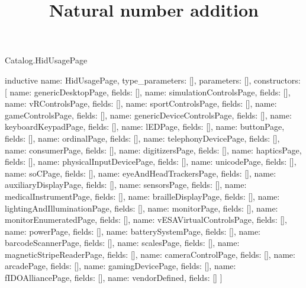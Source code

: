 \begin{lexlean}{Catalog.HidUsagePage}
\title{Natural number addition}
\begin{semanticmodule}
inductive{
  name: HidUsagePage,
  type_parameters: [],
  parameters: [],
  constructors: [
    {name: genericDesktopPage, fields: []},
    {name: simulationControlsPage, fields: []},
    {name: vRControlsPage, fields: []},
    {name: sportControlsPage, fields: []},
    {name: gameControlsPage, fields: []},
    {name: genericDeviceControlsPage, fields: []},
    {name: keyboardKeypadPage, fields: []},
    {name: lEDPage, fields: []},
    {name: buttonPage, fields: []},
    {name: ordinalPage, fields: []},
    {name: telephonyDevicePage, fields: []},
    {name: consumerPage, fields: []},
    {name: digitizersPage, fields: []},
    {name: hapticsPage, fields: []},
    {name: physicalInputDevicePage, fields: []},
    {name: unicodePage, fields: []},
    {name: soCPage, fields: []},
    {name: eyeAndHeadTrackersPage, fields: []},
    {name: auxiliaryDisplayPage, fields: []},
    {name: sensorsPage, fields: []},
    {name: medicalInstrumentPage, fields: []},
    {name: brailleDisplayPage, fields: []},
    {name: lightingAndIlluminationPage, fields: []},
    {name: monitorPage, fields: []},
    {name: monitorEnumeratedPage, fields: []},
    {name: vESAVirtualControlsPage, fields: []},
    {name: powerPage, fields: []},
    {name: batterySystemPage, fields: []},
    {name: barcodeScannerPage, fields: []},
    {name: scalesPage, fields: []},
    {name: magneticStripeReaderPage, fields: []},
    {name: cameraControlPage, fields: []},
    {name: arcadePage, fields: []},
    {name: gamingDevicePage, fields: []},
    {name: fIDOAlliancePage, fields: []},
    {name: vendorDefined, fields: []}
  ]
}
\end{semanticmodule}
\end{lexlean}
